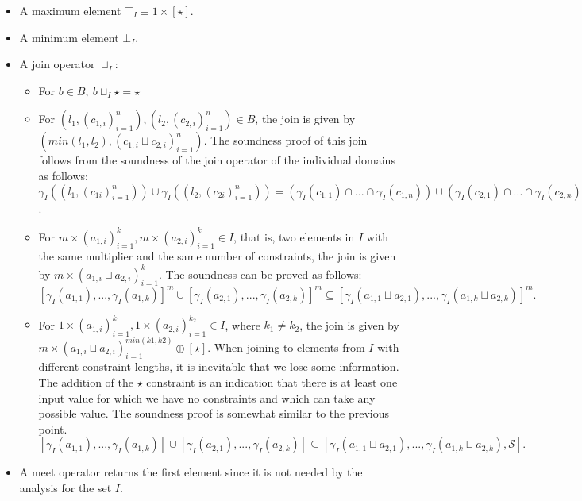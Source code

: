 \documentclass[]{report}
\begin{document}
\begin{itemize}
	\item A maximum element $ \top_{I} \equiv 1 \times [\star] .$
	\item A minimum element $ \bot_{I}. $
	\item A join operator $\sqcup_{I}$:
	\begin{itemize}
		\item For $ b \in B,\ b \sqcup_{I} \star = \star$
		\item For $(l_{1}, (c_{1,i})_{i=1}^{n}), (l_{2}, (c_{2,i})_{i=1}^{n}) \in B$, the join is given by $ (min(l_{1}, l_{2}), (c_{1,i} \sqcup c_{2,i})_{i=1}^{n}) $. The soundness proof of this join follows from the soundness of the join operator of the individual domains as follows: $ \gamma_{I}((l_{1}, (c_{1i})_{i=1}^{n})) \cup \gamma_{I}((l_{2}, (c_{2i})_{i=1}^{n})) = (\gamma_{I}(c_{1,1}) \cap ... \cap \gamma_{I}(c_{1, n})) \cup (\gamma_{I}(c_{2,1}) \cap ... \cap \gamma_{I}(c_{2, n})) \subseteq \gamma_{I}(c_{1, 1} \sqcup c_{2, 1}) \cap ... \cap \gamma_{I}(c_{1, n} \sqcup c_{2, n}) $. 
		\item For $ m \times (a_{1,i})_{i=1}^{k}, m \times (a_{2,i})_{i=1}^{k}  \in I$, that is, two elements in $ I $ with the same multiplier and the same number of constraints, the join is given by $ m \times (a_{1,i} \sqcup a_{2,i})_{i=1}^{k} $. The soundness can be proved as follows: $ [\gamma_{I}(a_{1,1}), ..., \gamma_{I}(a_{1,k})]^{m} \cup [\gamma_{I}(a_{2,1}), ..., \gamma_{I}(a_{2, k})]^{m} \subseteq [\gamma_{I}(a_{1,1} \sqcup a_{2, 1}), ..., \gamma_{I}(a_{1, k} \sqcup a_{2, k})]^{m}.$
		\item For $ 1 \times (a_{1, i})_{i=1}^{k_{1}}, 1 \times (a_{2, i})_{i=1}^{k_{2}} \in I $, where $ k_{1} \neq k_{2} $, the join is given by $ m \times (a_{1,i} \sqcup a_{2,i})_{i=1}^{min(k1, k2)} \oplus [\star]$. When joining to elements from $ I $ with different constraint lengths, it is inevitable that we lose some information. The addition of the $ \star $ constraint is an indication that there is at least one input value for which we have no constraints and which can take any possible value. The soundness proof is somewhat similar to the previous point. $ [\gamma_{I}(a_{1,1}), ..., \gamma_{I}(a_{1,k})] \cup [\gamma_{I}(a_{2,1}), ..., \gamma_{I}(a_{2, k})] \subseteq [\gamma_{I}(a_{1,1} \sqcup a_{2, 1}), ..., \gamma_{I}(a_{1, k} \sqcup a_{2, k}), \mathcal{S}].$
	\end{itemize}
	\item A meet operator returns the first element since it is not needed by the analysis for the set $ I $. 
	

\end{itemize}
\end{document}
